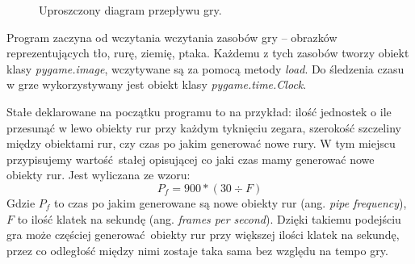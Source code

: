 \documentclass[a4paper, 12pt,oneside]{book}
\begin{document}
\begin{figure}
\begin{center}
\end{center}
\caption{Uproszczony diagram przepływu gry.}
\label{game_flow_chart}
\end{figure}
\newpage{}
Program zaczyna od wczytania wczytania zasobów gry -- obrazków reprezentujących
tło, rurę, ziemię, ptaka. Każdemu z tych zasobów tworzy obiekt klasy
\textit{pygame.image}, wczytywane są za pomocą metody \textit{load}.
Do śledzenia czasu w grze wykorzystywany jest obiekt klasy
\textit{pygame.time.Clock}.

Stałe deklarowane na początku programu to na
przykład: ilość jednostek o ile przesunąć w lewo obiekty rur przy każdym
tyknięciu zegara, szerokość szczeliny między obiektami rur, czy czas po jakim
generować nowe rury. W tym miejscu przypisujemy wartość stałej opisującej co
jaki czas mamy generować nowe obiekty rur. Jest wyliczana ze wzoru:
\begin{equation}
	P_f = 900 * (30 \div F)
\end{equation}
Gdzie $P_f$ to czas po jakim generowane są nowe obiekty rur
(ang. \textit{pipe frequency}), $F$ to ilość klatek na sekundę
(ang. \textit{frames per second}). Dzięki takiemu podejściu gra może częściej
generować obiekty rur przy większej ilości klatek na sekundę, przez co
odległość między nimi zostaje taka sama bez względu na tempo gry.
\end{document}
